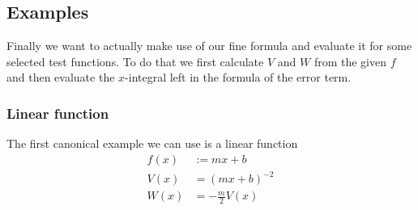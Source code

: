 \subsection{Examples}
Finally we want to actually make use of our fine formula and evaluate it for
some selected test functions. To do that we first calculate $V$ and $W$ from the
given $f$ and then evaluate the $x$-integral left in the formula of the error
term.

\subsubsection{Linear function}
The first canonical example we can use is a linear function
\begin{align}
  f(x) &:= mx + b \\
  V(x) &= (mx + b)^{-2} \\
  W(x) &= -\frac m 2 V(x)
\end{align}

